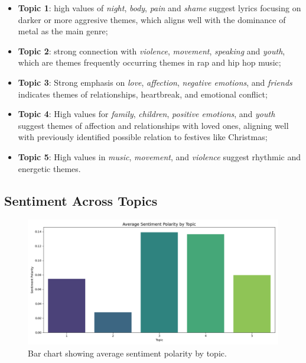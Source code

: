 \begin{itemize}
  \item \textbf{Topic 1}: high values of \textit{night}, \textit{body},
    \textit{pain} and \textit{shame} suggest lyrics focusing on darker or more
    aggresive themes, which aligns well with the dominance of metal as the main
    genre;
  \item \textbf{Topic 2}: strong connection with \textit{violence},
    \textit{movement}, \textit{speaking} and \textit{youth}, which are themes
    frequently occurring themes in rap and hip hop music;
  \item \textbf{Topic 3}: Strong emphasis on \textit{love}, \textit{affection},
    \textit{negative emotions}, and \textit{friends} indicates themes of
    relationships, heartbreak, and emotional conflict;
  \item \textbf{Topic 4}: High values for \textit{family}, \textit{children},
    \textit{positive emotions}, and \textit{youth} suggest themes of affection
    and relationships with loved ones, aligning well with previously identified
    possible relation to festives like Christmas;
  \item \textbf{Topic 5}: High values in \textit{music}, \textit{movement}, and
    \textit{violence} suggest rhythmic and energetic themes.
\end{itemize}

\subsection{Sentiment Across Topics}
\begin{center}
\begin{figure}[H]
  \centering
  \includegraphics[width=5in]{img/lda_sentiment.png}
  \caption{Bar chart showing average sentiment polarity by topic.}
  \label{Figure:fig_eh}
\end{figure}
\end{center}

